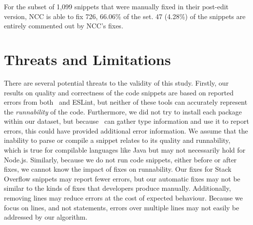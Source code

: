 \documentclass[conference]{IEEEtran}
\begin{document}
For the subset of 1,099 snippets that were manually fixed in their post-edit version, NCC is able to fix 726, 66.06\% of the set. 47 (4.28\%) of the snippets are entirely commented out by NCC's fixes.


\vspace{0.5cm}
\vspace{1em}

\section{Threats and Limitations}

There are several potential threats to the validity of this study. Firstly, our results on quality and correctness of the code snippets are based on reported errors from both \ts\ and ESLint, but neither of these tools can accurately represent the \emph{runnability} of the code. Furthermore, we did not try to install each package within our dataset, but because \ts\ can gather type information and use it to report errors, this could have provided additional error information. We assume that the inability to parse or compile a snippet relates to its quality and runnability, which is true for compilable languages like Java but may not necessarily hold for Node.js. Similarly, because we do not run code snippets, either before or after fixes, we cannot know the impact of fixes on runnability. Our fixes for Stack Overflow snippets may report fewer errors, but our automatic fixes may not be similar to the kinds of fixes that developers produce manually. Additionally, removing lines may reduce errors at the cost of expected behaviour. Because we focus on lines, and not statements, errors over multiple lines may not easily be addressed by our algorithm.
\end{document}
